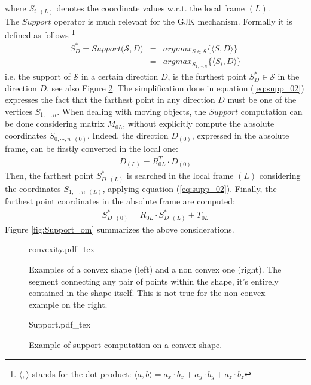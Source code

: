 \documentclass{article}
\begin{document}
where $S_{i\,\,\,(L)}$ denotes the coordinate values w.r.t. the local frame $(L)$.
\\
The $Support$ operator is much relevant for the GJK mechanism. Formally it is defined as follows \footnote{$\langle,\rangle$ stands for the dot product: $\langle a,b \rangle= a_x \cdot b_x + a_y \cdot b_y + a_z \cdot b_z $}
\begin{eqnarray}
S^*_D = Support \bigg ( \mathcal{S} , D \bigg) &=& argmax_{S\in \mathcal{S}} \bigg \lbrace \langle S, D \rangle \bigg \rbrace  \\
 											 &=& argmax_{S_{1,\cdots,n}} \bigg \lbrace \langle S_i, D \rangle \bigg \rbrace 
\label{eq:supp_02}									 
\end{eqnarray}
i.e. the support of $\mathcal{S}$ in a certain direction $D$, is the furthest point $S^*_D \in \mathcal{S}$ in the direction $D$, see also Figure \ref{fig:Support}. The simplification done in equation (\ref{eq:supp_02}) expresses the fact that the farthest point in any direction $D$ must be one of the vertices $S_{1,\cdots,n}$.
When dealing with moving objects, the $Support$ computation can be done considering matrix $M_{0L}$, without explicitly compute the absolute coordinates $S_{0,\cdots,n \,\,\, (0)}$. Indeed, the direction $D_{(0)}$, expressed in the absolute frame, can be firstly converted in the local one:
\begin{eqnarray}
D_{(L)} = R_{0L}^T \cdot D_{(0)}
\end{eqnarray}
Then, the farthest point $S^*_{D\,\,\,(L)}$ is searched in the local frame $(L)$ considering the coordinates $S_{1,\cdots,n \,\,\, (L)}$, applying equation (\ref{eq:supp_02}). Finally, the farthest point coordinates in the absolute frame are computed:
\begin{eqnarray}
S^*_{D\,\,\,(0)} = R_{0L} \cdot S^*_{D\,\,\,(L)} + T_{0L} 
\end{eqnarray}
Figure \ref{fig:Support_om} summarizes the above considerations.


\begin{figure}
	\centering
\def\svgwidth{0.7 \columnwidth}
{convexity.pdf_tex} 
	\caption{Examples of a convex shape (left) and a non convex one (right). The segment connecting any pair of points within the shape, it's entirely contained in the shape itself. This is not true for the non convex example on the right.}
	\label{fig:convexity}
\end{figure} 

\begin{figure}
	\centering
\def\svgwidth{0.95 \columnwidth}
{Support.pdf_tex} 
	\caption{Example of support computation on a convex shape.}
	\label{fig:Support}
\end{figure} 
\end{document}
